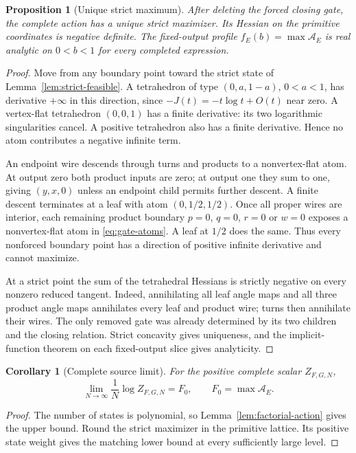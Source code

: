 \documentclass[11pt]{article}
\numberwithin{equation}{section}
\newtheorem{proposition}[theorem]{Proposition}
\newtheorem{corollary}[theorem]{Corollary}
\theoremstyle{definition}\newtheorem{definition}[theorem]{Definition}
\theoremstyle{remark}\newtheorem{remark}[theorem]{Remark}
\begin{document}
\begin{proposition}[Unique strict maximum]\label{prop:strict-maximum}
After deleting the forced closing gate, the complete action has a unique strict maximizer. Its Hessian on the primitive coordinates is negative definite. The fixed-output profile $f_E(b)=\max\mathcal A_E$ is real analytic on $0<b<1$ for every completed expression.
\end{proposition}
\begin{proof}
Move from any boundary point toward the strict state of Lemma~\ref{lem:strict-feasible}. A tetrahedron of type $(0,a,1-a)$, $0<a<1$, has derivative $+\infty$ in this direction, since $-J(t)=-t\log t+O(t)$ near zero. A vertex-flat tetrahedron $(0,0,1)$ has a finite derivative: its two logarithmic singularities cancel. A positive tetrahedron also has a finite derivative. Hence no atom contributes a negative infinite term.

An endpoint wire descends through turns and products to a nonvertex-flat atom. At output zero both product inputs are zero; at output one they sum to one, giving $(y,x,0)$ unless an endpoint child permits further descent. A finite descent terminates at a leaf with atom $(0,1/2,1/2)$. Once all proper wires are interior, each remaining product boundary $p=0$, $q=0$, $r=0$ or $w=0$ exposes a nonvertex-flat atom in \eqref{eq:gate-atoms}. A leaf at $1/2$ does the same. Thus every nonforced boundary point has a direction of positive infinite derivative and cannot maximize.

At a strict point the sum of the tetrahedral Hessians is strictly negative on every nonzero reduced tangent. Indeed, annihilating all leaf angle maps and all three product angle maps annihilates every leaf and product wire; turns then annihilate their wires. The only removed gate was already determined by its two children and the closing relation. Strict concavity gives uniqueness, and the implicit-function theorem on each fixed-output slice gives analyticity.
\end{proof}

\begin{corollary}[Complete source limit]\label{cor:complete-limit}
For the positive complete scalar $Z_{F,G,N}$,
\[
 \lim_{N\to\infty}\frac1N\log Z_{F,G,N}=F_0,
 \qquad F_0=\max\mathcal A_E.
\]
\end{corollary}
\begin{proof}
The number of states is polynomial, so Lemma~\ref{lem:factorial-action} gives the upper bound. Round the strict maximizer in the primitive lattice. Its positive state weight gives the matching lower bound at every sufficiently large level.
\end{proof}
\end{document}
